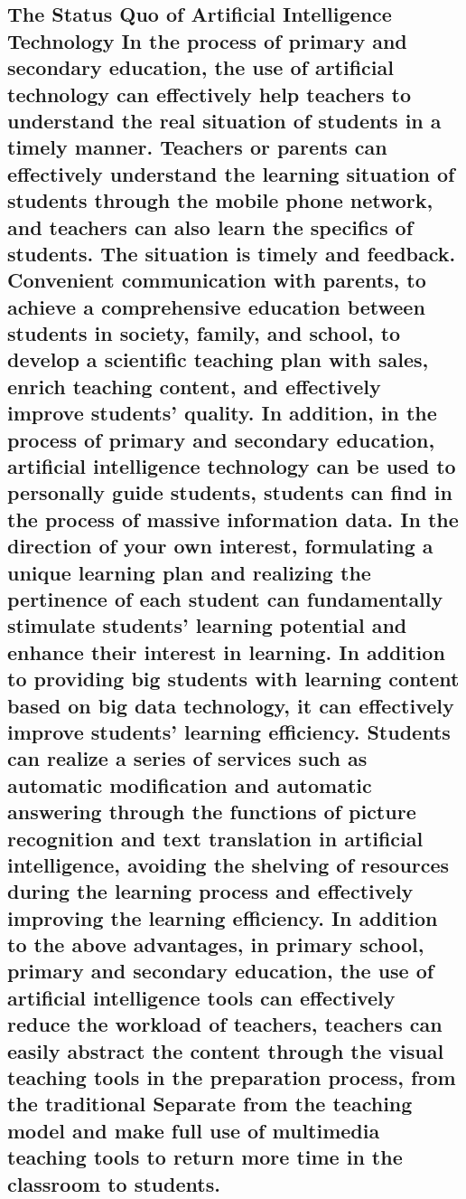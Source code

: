 \documentclass[lang=en,11pt,a4paper,towcolumn]{elegantpaper}
\begin{document}
\subsection{The Status Quo of Artificial Intelligence Technology In the process of primary and secondary education, the use of artificial technology can effectively help teachers to understand the real situation of students in a timely manner. Teachers or parents can effectively understand the learning situation of students through the mobile phone network, and teachers can also learn the specifics of students. The situation is timely and feedback. Convenient communication with parents, to achieve a comprehensive education between students in society, family, and school, to develop a scientific teaching plan with sales, enrich teaching content, and effectively improve students' quality. In addition, in the process of primary and secondary education, artificial intelligence technology can be used to personally guide students, students can find in the process of massive information data. In the direction of your own interest, formulating a unique learning plan and realizing the pertinence of each student can fundamentally stimulate students' learning potential and enhance their interest in learning. In addition to providing big students with learning content based on big data technology, it can effectively improve students' learning efficiency. Students can realize a series of services such as automatic modification and automatic answering through the functions of picture recognition and text translation in artificial intelligence, avoiding the shelving of resources during the learning process and effectively improving the learning efficiency. In addition to the above advantages, in primary school, primary and secondary education, the use of artificial intelligence tools can effectively reduce the workload of teachers, teachers can easily abstract the content through the visual teaching tools in the preparation process, from the traditional Separate from the teaching model and make full use of multimedia teaching tools to return more time in the classroom to students.
}
\end{document}
